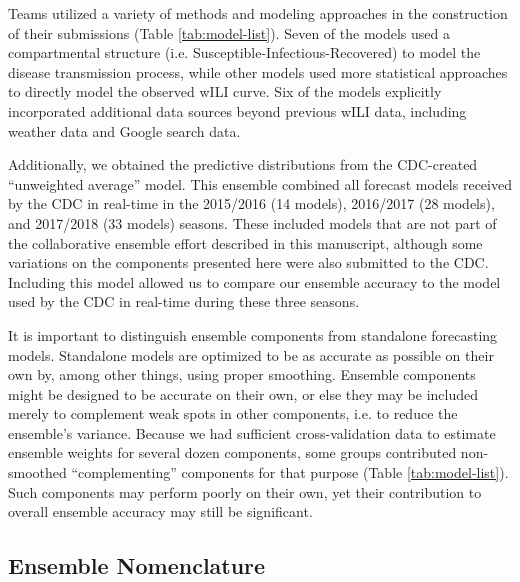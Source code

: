 \documentclass{article}\usepackage[]{graphicx}\usepackage[]{color}
\begin{document}
Teams utilized a variety of methods and modeling approaches in the construction of their submissions (Table \ref{tab:model-list}). Seven of the models used a compartmental structure (i.e. Susceptible-Infectious-Recovered) to model the disease transmission process, while other models used more statistical approaches to directly model the observed wILI curve. Six of the models explicitly incorporated additional data sources beyond previous wILI data, including weather data and Google search data.  

Additionally, we obtained the predictive distributions from the CDC-created ``unweighted average'' model. This ensemble combined all forecast models received by the CDC in real-time in the 2015/2016 (14 models), 2016/2017 (28 models), and 2017/2018 (33 models) seasons.\cite{McGowan2018} These included models that are not part of the collaborative ensemble effort described in this manuscript, although some variations on the components presented here were also submitted to the CDC. Including this model allowed us to compare our ensemble accuracy to the model used by the CDC in real-time during these three seasons.

It is important to distinguish ensemble components from standalone forecasting models.  
Standalone models are optimized to be as accurate as possible on their own by, among other things, using proper smoothing.
Ensemble components might be designed to be accurate on their own, or else they may be included merely to complement weak spots in other components, i.e. to reduce the ensemble's variance.  
Because we had sufficient cross-validation data to estimate ensemble weights for several dozen components, some groups contributed non-smoothed ``complementing'' components for that purpose (Table \ref{tab:model-list}).  
Such components may perform poorly on their own, yet their contribution to overall ensemble accuracy may still be significant.

\subsection{Ensemble Nomenclature}
\end{document}
